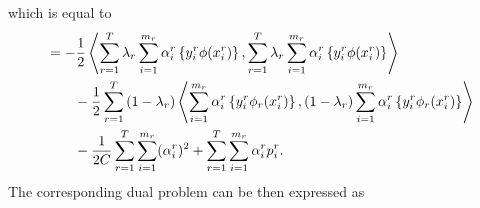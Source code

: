 which is equal to
\begin{equation}\nonumber
    \begin{aligned}
        &= - \frac{1}{2} \bm{\left\langle}  \sum_{r= 1}^T  \lambda_r \sum_{i=1}^{m_r} {\alpha_i^r} \left\lbrace y_i^r \phi({x}_i^r) \right\rbrace,  \sum_{r= 1}^T \lambda_r \sum_{i=1}^{m_r} {\alpha_i^r} \left\lbrace y_i^r \phi({x}_i^r) \right\rbrace \bm{\right\rangle} \\
        &\qquad - \frac{1}{2} \sum_{r= 1}^T {(1-\lambda_r) \bm{\left\langle} \sum_{i=1}^{m_r} {\alpha_i^r} \left\lbrace y_i^r \phi_r({x}_i^r) \right\rbrace, (1-\lambda_r) \sum_{i=1}^{m_r} {\alpha_i^r} \left\lbrace y_i^r \phi_r({x}_i^r) \right\rbrace \bm{\right\rangle}} \\
        &\qquad - \frac{1}{2C} \sum_{r=1}^T \sum_{i=1}^{m_r} (\alpha_i^r)^2  +  \sum_{r= 1}^T \sum_{i=1}^{m_r} \alpha_i^r  p_{i}^r .
    \end{aligned}
\end{equation}
The corresponding dual problem can be then expressed as
